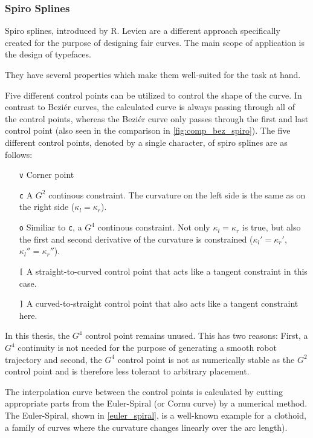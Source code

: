 \subsubsection{Spiro Splines}\label{sec:smoothspiro}

Spiro splines, introduced by R. Levien \cite{levien2009spiral} are a different approach specifically created for the purpose of designing fair curves. The main scope of application is the design of typefaces. 

They have several properties which make them well-suited for the task at hand.

Five different control points can be utilized to control the shape of the curve. In contrast to Beziér curves, the calculated curve is always passing through all of the control points, whereas the Beziér curve only passes through the first and last control point (also seen in the comparison in \autoref{fig:comp_bez_spiro}). The five different control points, denoted by a single character, of spiro splines are as follows:

\begin{itemize}
\item[\texttt{v}] Corner point
\item[\texttt{c}] A $G^2$ continous constraint. The curvature  on the left side is the same as on the right side ($\kappa_l = \kappa_r$).
\item[\texttt{o}] Similiar to \texttt{c}, a $G^4$ continous constraint. Not only $\kappa_l = \kappa_r$ is true, but also the first and second derivative of the curvature is constrained ($\kappa_l' = \kappa_r'$, $\kappa_l'' = \kappa_r''$).
\item[\texttt{[}] A straight-to-curved control point that acts like a tangent constraint in this case.
\item[\texttt{]}] A curved-to-straight control point that also acts like a tangent constraint here.
\end{itemize}

In this thesis, the $G^4$ control point remains unused. This has two reasons: First, a $G^4$ continuity is not needed for the purpose of generating a smooth robot trajectory and second, the $G^4$ control point is not as numerically stable as the $G^2$ control point and is therefore less tolerant to arbitrary placement.

The interpolation curve between the control points is calculated by cutting appropriate parts from the Euler-Spiral (or Cornu curve) by a numerical method. The Euler-Spiral, shown in \autoref{euler_spiral}, is a well-known example for a clothoid, a family of curves where the curvature changes linearly over the arc length). %

